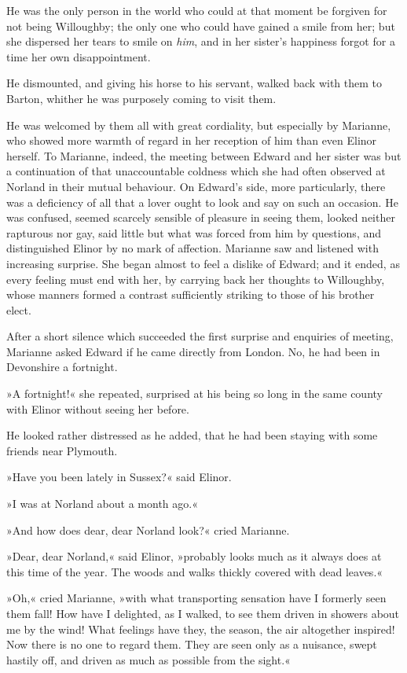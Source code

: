 He was the only person in the world who could at that moment be forgiven for not being Willoughby; the only one who could have gained a smile from her; but she dispersed her tears to smile on \textit{him}, and in her sister’s happiness forgot for a time her own disappointment.

He dismounted, and giving his horse to his servant, walked back with them to Barton, whither he was purposely coming to visit them.

He was welcomed by them all with great cordiality, but especially by Marianne, who showed more warmth of regard in her reception of him than even Elinor herself. To Marianne, indeed, the meeting between Edward and her sister was but a continuation of that unaccountable coldness which she had often observed at Norland in their mutual behaviour. On Edward’s side, more particularly, there was a deficiency of all that a lover ought to look and say on such an occasion. He was confused, seemed scarcely sensible of pleasure in seeing them, looked neither rapturous nor gay, said little but what was forced from him by questions, and distinguished Elinor by no mark of affection. Marianne saw and listened with increasing surprise. She began almost to feel a dislike of Edward; and it ended, as every feeling must end with her, by carrying back her thoughts to Willoughby, whose manners formed a contrast sufficiently striking to those of his brother elect.

After a short silence which succeeded the first surprise and enquiries of meeting, Marianne asked Edward if he came directly from London. No, he had been in Devonshire a fortnight.

»A fortnight!« she repeated, surprised at his being so long in the same county with Elinor without seeing her before.

He looked rather distressed as he added, that he had been staying with some friends near Plymouth.

»Have you been lately in Sussex?« said Elinor.

»I was at Norland about a month ago.«

»And how does dear, dear Norland look?« cried Marianne.

»Dear, dear Norland,« said Elinor, »probably looks much as it always does at this time of the year. The woods and walks thickly covered with dead leaves.«

»Oh,« cried Marianne, »with what transporting sensation have I formerly seen them fall! How have I delighted, as I walked, to see them driven in showers about me by the wind! What feelings have they, the season, the air altogether inspired! Now there is no one to regard them. They are seen only as a nuisance, swept hastily off, and driven as much as possible from the sight.«

